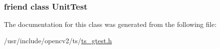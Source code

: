 \hypertarget{classtesting_1_1TestResult_a832b4d233efee1a32feb0f4190b30d39}{
\subsubsection[{Unit\-Test}]{\setlength{\rightskip}{0pt plus 5cm}friend class {\bf Unit\-Test}\hspace{0.3cm}{\ttfamily [friend]}}}\label{classtesting_1_1TestResult_a832b4d233efee1a32feb0f4190b30d39}


The documentation for this class was generated from the following file\-:\begin{DoxyCompactItemize}
\item 
/usr/include/opencv2/ts/\hyperlink{ts__gtest_8h}{ts\-\_\-gtest.\-h}\end{DoxyCompactItemize}
